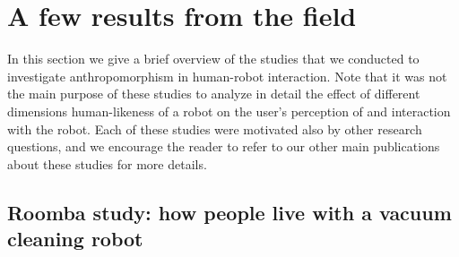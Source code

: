 \documentclass{frontiersSCNS} %
\begin{document}


%
%
%
%
%
%

\section{A few results from the field}
\label{sec:overview-studies}

In this section we give a brief overview of the studies that we conducted to investigate anthropomorphism in human-robot interaction. Note that it was not the main purpose of these studies to analyze in detail the effect of different dimensions human-likeness of a robot on the user's perception of and interaction with the robot. Each of these studies were motivated also by other research questions, and we encourage the reader to refer to our other main publications about these studies for more details.


\subsection{Roomba study: how people live with a vacuum cleaning robot}
\end{document}

